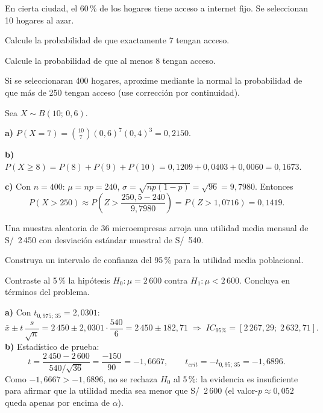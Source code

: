 \documentclass{academic-exam}
\begin{document}
\begin{ejercicio}[7][Probabilidad]
En cierta ciudad, el 60\,\% de los hogares tiene acceso a internet fijo.
Se seleccionan 10 hogares al azar.
\begin{apartados}
  \item Calcule la probabilidad de que exactamente 7 tengan acceso. 
  \item Calcule la probabilidad de que al menos 8 tengan acceso. 
  \item Si se seleccionaran 400 hogares, aproxime mediante la normal la
        probabilidad de que más de 250 tengan acceso (use corrección por
        continuidad). 
\end{apartados}
\espaciorespuesta{7cm}
\begin{solucion}
Sea $X\sim B(10;\,0{,}6)$.

\textbf{a)} $P(X=7) = \binom{10}{7}(0{,}6)^{7}(0{,}4)^{3} = 0{,}2150$.

\textbf{b)} $P(X\ge 8) = P(8)+P(9)+P(10) =
0{,}1209 + 0{,}0403 + 0{,}0060 = 0{,}1673$.

\textbf{c)} Con $n=400$: $\mu = np = 240$,
$\sigma = \sqrt{np(1-p)} = \sqrt{96} = 9{,}7980$. Entonces
\[
  P(X > 250) \approx P\!\left(Z > \frac{250{,}5 - 240}{9{,}7980}\right)
  = P(Z > 1{,}0716) = 0{,}1419.
\]
\end{solucion}
\end{ejercicio}

\begin{ejercicio}[7][Inferencia]
Una muestra aleatoria de 36 microempresas arroja una utilidad media
mensual de S/~2\,450 con desviación estándar muestral de S/~540.
\begin{apartados}
  \item Construya un intervalo de confianza del 95\,\% para la utilidad
        media poblacional. 
  \item Contraste al 5\,\% la hipótesis $H_0\colon \mu = 2\,600$ contra
        $H_1\colon \mu < 2\,600$. Concluya en términos del problema. 
\end{apartados}
\espaciorespuesta{7cm}
\begin{solucion}
\textbf{a)} Con $t_{0{,}975;\,35} = 2{,}0301$:
\[
  \bar{x} \pm t\,\frac{s}{\sqrt{n}}
  = 2\,450 \pm 2{,}0301\cdot\frac{540}{6}
  = 2\,450 \pm 182{,}71
  \;\Rightarrow\; IC_{95\%} = [2\,267{,}29;\; 2\,632{,}71].
\]
\textbf{b)} Estadístico de prueba:
\[
  t = \frac{2\,450 - 2\,600}{540/\sqrt{36}} = \frac{-150}{90} = -1{,}6667,
  \qquad t_{crit} = -t_{0{,}95;\,35} = -1{,}6896.
\]
Como $-1{,}6667 > -1{,}6896$, no se rechaza $H_0$ al 5\,\%: la evidencia
es insuficiente para afirmar que la utilidad media sea menor que
S/~2\,600 (el valor-$p\approx 0{,}052$ queda apenas por encima de
$\alpha$).
\end{solucion}
\end{ejercicio}

\findelexamen
\end{document}
